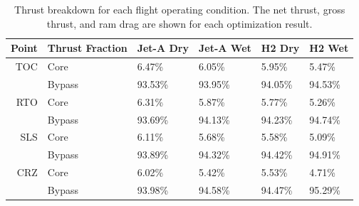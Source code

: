 \documentclass[conf]{new-aiaa}
\begin{document}
\begin{table}[hbt!]
  \centering
  \caption{Thrust breakdown for each flight operating condition.
    The net thrust, gross thrust, and ram drag are shown for each optimization result.
  }
  \small
  \renewcommand{\arraystretch}{1.2}
  \begin{tabular}{r l l l l l}
    Point & Thrust Fraction & Jet-A Dry & Jet-A Wet & H2 Dry  & H2 Wet  \\
    \toprule
    TOC   & Core            & 6.47\%    & 6.05\%    & 5.95\%  & 5.47\%  \\
          & Bypass          & 93.53\%   & 93.95\%   & 94.05\% & 94.53\% \\
    \hline
    RTO   & Core            & 6.31\%    & 5.87\%    & 5.77\%  & 5.26\%  \\
          & Bypass          & 93.69\%   & 94.13\%   & 94.23\% & 94.74\% \\
    \hline
    SLS   & Core            & 6.11\%    & 5.68\%    & 5.58\%  & 5.09\%  \\
          & Bypass          & 93.89\%   & 94.32\%   & 94.42\% & 94.91\% \\
    \hline
    CRZ   & Core            & 6.02\%    & 5.42\%    & 5.53\%  & 4.71\%  \\
          & Bypass          & 93.98\%   & 94.58\%   & 94.47\% & 95.29\% \\
    \bottomrule
  \end{tabular}
  \label{tab:thrust}
\end{table}

\end{document}
